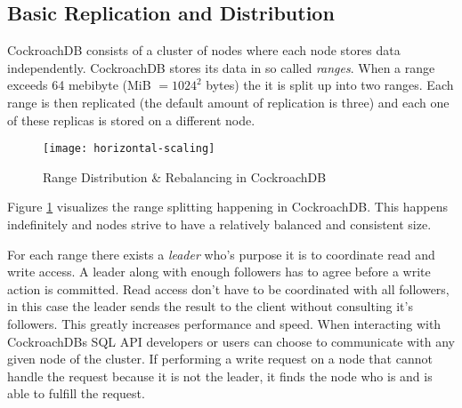 \subsection{Basic Replication and Distribution}
CockroachDB consists of a cluster of nodes where each node stores data independently.
CockroachDB stores its data in so called \emph{ranges}. When a range exceeds 64 mebibyte (MiB $ = 1024^2$ bytes) the it is split up into two ranges. Each range is then replicated (the default amount of replication is three) and each one of these replicas is stored on a different node.

\begin{figure}[H]
    \texttt{[image: horizontal-scaling]}
    \caption{Range Distribution \& Rebalancing in CockroachDB\cite{cockroach-newstack}}
    \label{fig:scaling}
\end{figure}


Figure \ref{fig:scaling} visualizes the range splitting happening in CockroachDB. This happens indefinitely and nodes strive to have a relatively balanced and consistent size.

\medskip
For each range there exists a \emph{leader} who's purpose it is to coordinate read and write access. A leader along with enough followers has to agree before a write action is committed.
Read access don't have to be coordinated with all followers, in this case the leader sends the result to the client without consulting it's followers. This greatly increases performance and speed.
When interacting with CockroachDBs SQL API developers or users can choose to communicate with any given node of the cluster.
If performing a write request on a node that cannot handle the request because it is not the leader, it finds the node who is and is able to fulfill the request.
\cite{cockroach-architecture}


